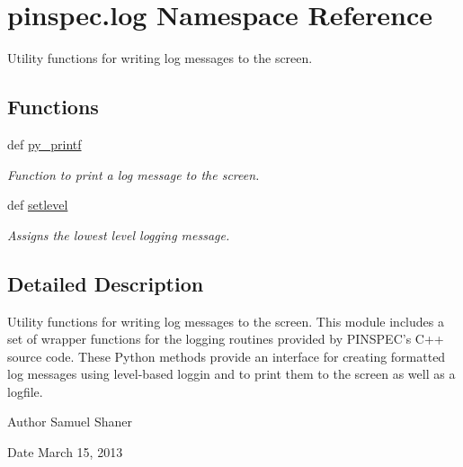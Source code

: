 \hypertarget{namespacepinspec_1_1log}{\section{pinspec.\-log Namespace Reference}
\label{namespacepinspec_1_1log}
}


Utility functions for writing log messages to the screen.  


\subsection*{Functions}
\begin{DoxyCompactItemize}
\item 
def \hyperlink{namespacepinspec_1_1log_a541e006b2440f460574f9f3017279a1d}{py\-\_\-printf}
\begin{DoxyCompactList}\small\item\em Function to print a log message to the screen. \end{DoxyCompactList}\item 
def \hyperlink{namespacepinspec_1_1log_aa886f707adb88128a27972d949cb526f}{setlevel}
\begin{DoxyCompactList}\small\item\em Assigns the lowest level logging message. \end{DoxyCompactList}\end{DoxyCompactItemize}


\subsection{Detailed Description}
Utility functions for writing log messages to the screen. This module includes a set of wrapper functions for the logging routines provided by P\-I\-N\-S\-P\-E\-C's C++ source code. These Python methods provide an interface for creating formatted log messages using level-\/based loggin and to print them to the screen as well as a logfile. \begin{DoxyAuthor}{Author}
Samuel Shaner 
\end{DoxyAuthor}
\begin{DoxyDate}{Date}
March 15, 2013 
\end{DoxyDate}


